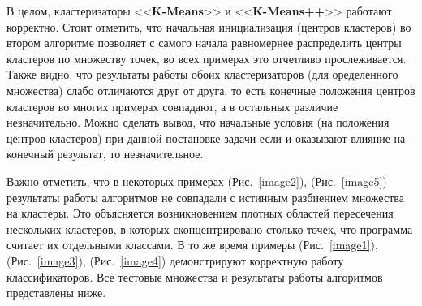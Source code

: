 \documentclass[12pt, a4paper]{article}
\begin{document}
    В целом, кластеризаторы <<\textbf{K-Means}>> и <<\textbf{K-Means++}>> 
    работают корректно. Стоит отметить, что начальная инициализация (центров 
    кластеров) во втором алгоритме позволяет с самого начала равномернее 
    распределить центры кластеров по множеству точек, во всех примерах это 
    отчетливо прослеживается. Также видно, что результаты работы обоих 
    кластеризаторов (для оределенного множества) слабо отличаются друг от 
    друга, то есть конечные положения центров кластеров во многих примерах 
    совпадают, а в остальных различие незначительно. Можно сделать вывод, что 
    начальные условия (на положения центров кластеров) при данной постановке 
    задачи если и оказывают влияние на конечный результат, то незначительное.
    
    Важно отметить, что в некоторых примерах (Рис.~\ref{image2}), 
    (Рис.~\ref{image5}) результаты работы алгоритмов не совпадали с истинным 
    разбиением множества на кластеры. Это объясняется возникновением плотных 
    областей пересечения нескольких кластеров, в которых сконцентрировано 
    столько точек, что программа считает их отдельными классами. В то же 
    время примеры (Рис.~\ref{image1}), (Рис.~\ref{image3}), 
    (Рис.~\ref{image4}) демонстрируют корректную работу классификаторов. Все 
    тестовые множества и результаты работы алгоритмов представлены ниже.
    
\end{document}
